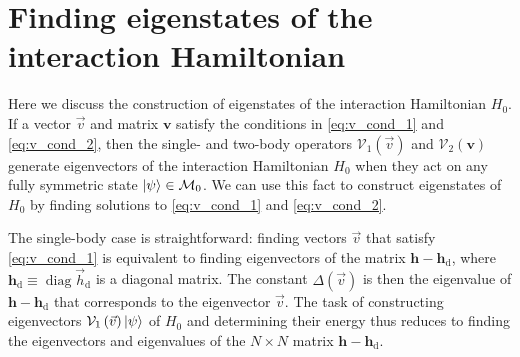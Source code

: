 \documentclass[nofootinbib,notitlepage,11pt]{revtex4-2}
\newcommand{\p}[1]{\left(#1\right)} %
\newcommand{\m}{\bm} %
\renewcommand{\v}{\vec} %
\newcommand{\1}{\mathds{1}}
\renewcommand{\d}{\text{d}}
\newcommand{\M}{\mathcal{M}}
\newcommand{\V}{\mathcal{V}}
\DeclareMathOperator{\diag}{diag}
\begin{document}
\section{Finding eigenstates of the interaction Hamiltonian}

Here we discuss the construction of eigenstates of the interaction
Hamiltonian $H_0$.  If a vector $\v v$ and matrix $\m v$ satisfy the
conditions in \eqref{eq:v_cond_1} and \eqref{eq:v_cond_2}, then the
single- and two-body operators $\V_1\p{\v v}$ and $\V_2\p{\m v}$
generate eigenvectors of the interaction Hamiltonian $H_0$ when they
act on any fully symmetric state $\ket\psi\in\M_0$.  We can use this
fact to construct eigenstates of $H_0$ by finding solutions to
\eqref{eq:v_cond_1} and \eqref{eq:v_cond_2}.

The single-body case is straightforward: finding vectors $\v v$ that
satisfy \eqref{eq:v_cond_1} is equivalent to finding eigenvectors of
the matrix $\m h-\m h_\d$, where $\m h_\d\equiv\diag\v h_\d$ is a
diagonal matrix.  The constant $\Delta\p{\v v}$ is then the eigenvalue
of $\m h-\m h_\d$ that corresponds to the eigenvector $\v v$.  The
task of constructing eigenvectors $\V_1\p{\v v}\ket\psi$ of $H_0$ and
determining their energy thus reduces to finding the eigenvectors and
eigenvalues of the $N\times N$ matrix $\m h-\m h_\d$.
\end{document}
